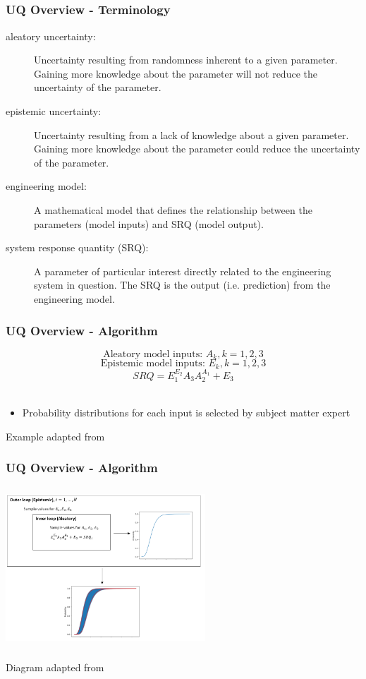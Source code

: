 \documentclass[handout, xcolor=dvipsnames]{beamer}
\begin{document}
\subsection{}
\begin{frame}
	\frametitle{UQ Overview - Terminology}
	\begin{description}
		\item[aleatory uncertainty:] Uncertainty resulting from randomness inherent to a given parameter. Gaining more knowledge about the parameter will not reduce the uncertainty of the parameter. 
	  \item[epistemic uncertainty:] Uncertainty resulting from a lack of knowledge about a given parameter. Gaining more knowledge about the parameter could reduce the uncertainty of the parameter. 
	  \item[engineering model:] A mathematical model that defines the relationship between the parameters (model inputs) and SRQ (model output). 
	  \item[system response quantity (SRQ):] A parameter of particular interest directly related to the engineering system in question. The SRQ is the output (i.e. prediction) from the engineering model.

	\end{description}
\end{frame}


\begin{frame}
	\frametitle{UQ Overview - Algorithm}
	\[\text{Aleatory model inputs: }A_k, k = 1, 2, 3 \]
	\[\text{Epistemic model inputs: }E_k, k = 1, 2, 3\]
	\[ SRQ = E_1^{E_2}A_3A_2^{A_1} + E_3\]
	\\
	\begin{itemize}
	\item Probability distributions for each input is selected by subject matter expert
	\end{itemize}	
	\begin{center}
	{\scriptsize Example adapted from \cite{EW2018}}
	\end{center}
\end{frame}

\begin{frame}
	\frametitle{UQ Overview - Algorithm}
	\begin{center}
	\begin{center} 
	\includegraphics[height=6cm,width=7.5cm]{figures/uq_algo.png}
	\end{center}	
	{\scriptsize Diagram adapted from \cite{EW2018}}
	\end{center}
\end{frame}
\end{document}
